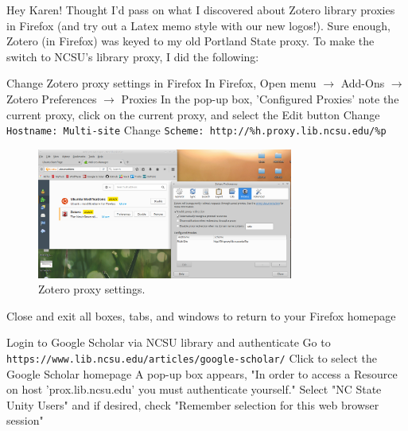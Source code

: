 \documentclass[letterpaper,11pt]{texMemo}
\begin{document}
\maketitle
Hey Karen! Thought I'd pass on what I discovered about Zotero library proxies in Firefox (and try out a Latex memo style with our new logos!). Sure enough, Zotero (in Firefox) was keyed to my old Portland State proxy. To make the switch to NCSU's library proxy, I did the following:
\begin{outline}[enumerate]
\1 Change Zotero proxy settings in Firefox
\2 In Firefox, Open menu $\rightarrow $ Add-Ons $\rightarrow $ Zotero Preferences $\rightarrow $ Proxies
\2 In the pop-up box, 'Configured Proxies' note the current proxy, click on the current proxy, and select the Edit button
\3 Change \verb!Hostname: Multi-site!
\3 Change \verb!Scheme: http://%h.proxy.lib.ncsu.edu/%p!
  
\begin{figure} [!htbp]
  \begin{center}
    \includegraphics[width=0.75\textwidth]{graphics/Screenshot_2017-08-19_09-08-59.png}
    \caption{Zotero proxy settings.}
    \label{fig:}
  \end{center}
\end{figure}

\2 Close and exit all boxes, tabs, and windows to return to your Firefox homepage

\newpage
\1 Login to Google Scholar via NCSU library and authenticate
\2 Go to \verb!https://www.lib.ncsu.edu/articles/google-scholar/!
\2 Click to select the Google Scholar homepage
\2 A pop-up box appears, "In order to access a Resource on host 'prox.lib.ncsu.edu' you must authenticate yourself."
\2 Select "NC State Unity Users" and if desired, check "Remember selection for this web browser session"


\end{outline}
\end{document}
